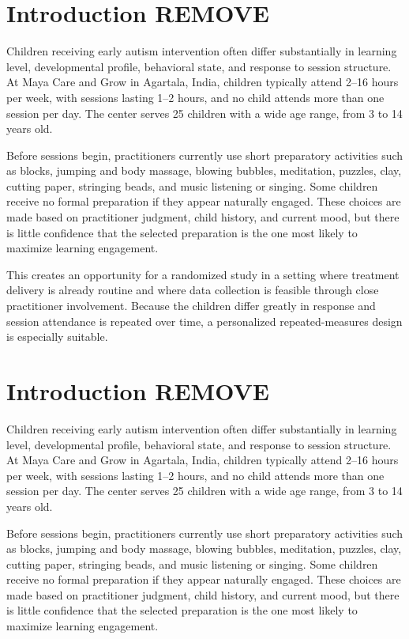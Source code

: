 \documentclass[9pt,a4paper,twocolumn,twoside]{rho-class/rho}
\begin{document}

	
	\section{Introduction REMOVE}
	
	
	Children receiving early autism intervention often differ substantially in learning level, developmental profile, behavioral state, and response to session structure. At Maya Care and Grow in Agartala, India, children typically attend 2–16 hours per week, with sessions lasting 1–2 hours, and no child attends more than one session per day. The center serves 25 children with a wide age range, from 3 to 14 years old.
	
	Before sessions begin, practitioners currently use short preparatory activities such as blocks, jumping and body massage, blowing bubbles, meditation, puzzles, clay, cutting paper, stringing beads, and music listening or singing. Some children receive no formal preparation if they appear naturally engaged. These choices are made based on practitioner judgment, child history, and current mood, but there is little confidence that the selected preparation is the one most likely to maximize learning engagement.
	
	This creates an opportunity for a randomized study in a setting where treatment delivery is already routine and where data collection is feasible through close practitioner involvement. Because the children differ greatly in response and session attendance is repeated over time, a personalized repeated-measures design is especially suitable.
	
	
	\section{Introduction REMOVE}
	
	
	Children receiving early autism intervention often differ substantially in learning level, developmental profile, behavioral state, and response to session structure. At Maya Care and Grow in Agartala, India, children typically attend 2–16 hours per week, with sessions lasting 1–2 hours, and no child attends more than one session per day. The center serves 25 children with a wide age range, from 3 to 14 years old.
	
	Before sessions begin, practitioners currently use short preparatory activities such as blocks, jumping and body massage, blowing bubbles, meditation, puzzles, clay, cutting paper, stringing beads, and music listening or singing. Some children receive no formal preparation if they appear naturally engaged. These choices are made based on practitioner judgment, child history, and current mood, but there is little confidence that the selected preparation is the one most likely to maximize learning engagement.
	
\end{document}
